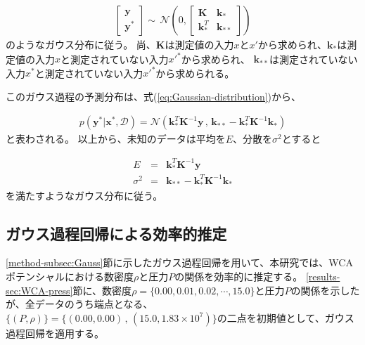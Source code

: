 \documentclass[titlepage]{jsreport}
\begin{document}
{{{\large
\begin{eqnarray}
    \left[
        \begin{array}{l}
            \bm{y} \\
            \bm{y}^* 
        \end{array}
    \right]
    {\sim}\,{\mathcal{N}}
    \left(0,
        \left[
            \begin{array}{cc}
                \bm{K} & \bm{k}_*\\    
                \bm{k}_*^T & \bm{k}_{**}
            \end{array}
        \right]
    \right) \label{eq:Gaussian-distribution}
\end{eqnarray}
\normalsize
のようなガウス分布に従う。
尚、$\bm{K}$は測定値の入力$x$と$x'$から求められ、$\bm{k}_*$は測定値の入力$x$と測定されていない入力$x'^*$から求められ、
$\bm{k}_{**}$は測定されていない入力$x^*$と測定されていない入力$x'^*$から求められる。

このガウス過程の予測分布は、式(\ref{eq:Gaussian-distribution})から、

\large
\begin{eqnarray}
p(\bm{y}^*|\bm{x}^*,\mathcal{D})
={\mathcal{N}}(\bm{k}_*^T\bm{K}^{-1}\bm{y}\,,\,\bm{k}_{**}-\bm{k}_*^T\bm{K}^{-1}\bm{k}_*)  \label{eq:Gaussian-predicted-distribution}
\end{eqnarray}
\normalsize
と表わされる。
以上から、未知のデータは平均を$E$、分散を$\sigma^2$とすると

\large
\begin{eqnarray}
    E&=&\bm{k}_*^T\bm{K}^{-1}\bm{y}\\ \label{eq:Gaussian-predicted-average}
    \sigma^2&=&\bm{k}_{**}-\bm{k}_*^T\bm{K}^{-1}\bm{k}_* \label{eq:Gaussian-predicted-distribution}
\end{eqnarray}
\normalsize
を満たすようなガウス分布に従う。


\subsection{ガウス過程回帰による効率的推定}\label{method-subsec:Gaussian-estimation}
\ref{method-subsec:Gauss}節に示したガウス過程回帰を用いて、本研究では、WCAポテンシャルにおける数密度$\rho$と圧力$P$の関係を効率的に推定する。
\ref{results-sec:WCA-press}節に、数密度$\rho=\{0.00,0.01,0.02,\cdots,15.0\}$と圧力$P$の関係を示したが、全データのうち端点となる、
$\{(P,\rho)\}=\{(0.00,0.00)\,,\,(15.0,1.83×10^7)\}$の二点を初期値として、ガウス過程回帰を適用する。

}}}
\end{document}
